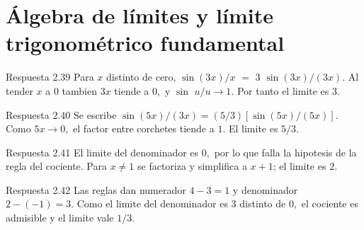 \documentclass[10pt,a4paper,oneside,openany]{book}
\begin{document}
\section{Álgebra de límites y límite trigonométrico fundamental}
\begin{PSevenAnswerFixed}{Respuesta 2.39}
Para \(x\) distinto de cero, \(\sin(3x)/x\) \(=\) \(3\) \(\sin(3x)/(3x)\). Al tender \(x\) a \(0\) tambien \(3x\) tiende a \(0,\) y \(\sin\) \(u/u\to 1\). Por tanto el limite es \(3\).
\end{PSevenAnswerFixed}
\begin{PSevenAnswerFixed}{Respuesta 2.40}
Se escribe \(\sin(5x)/(3x)=(5/3)[\sin(5x)/(5x)]\). Como \(5x\to 0,\) el factor entre corchetes tiende a \(1\). El limite es \(5/3\).
\end{PSevenAnswerFixed}
\begin{PSevenAnswerFixed}{Respuesta 2.41}
El limite del denominador es \(0,\) por lo que falla la hipotesis de la regla del cociente. Para \(x\ne 1\) se factoriza y simplifica a \(x+1\); el limite es \(2\).
\end{PSevenAnswerFixed}
\begin{PSevenAnswerFixed}{Respuesta 2.42}
Las reglas dan numerador \(4-3=1\) y denominador \(2-(-1)=3\). Como el limite del denominador es \(3\) distinto de \(0,\) el cociente es admisible y el limite vale \(1/3\).
\end{PSevenAnswerFixed}
\end{document}
